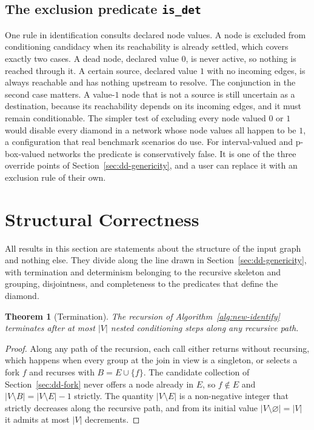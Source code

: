 \documentclass[12pt]{report}
\newtheorem{theorem}{Theorem}
\begin{document}
\subsection{The exclusion predicate \texttt{is\_det}}
\label{sec:dd-isdet}

One rule in identification consults declared node values. A node is excluded from conditioning candidacy when its reachability is already settled, which covers exactly two cases. A dead node, declared value $0$, is never active, so nothing is reached through it. A certain source, declared value $1$ with no incoming edges, is always reachable and has nothing upstream to resolve. The conjunction in the second case matters. A value-$1$ node that is not a source is still uncertain as a destination, because its reachability depends on its incoming edges, and it must remain conditionable. The simpler test of excluding every node valued $0$ or $1$ would disable every diamond in a network whose node values all happen to be $1$, a configuration that real benchmark scenarios do use. For interval-valued and p-box-valued networks the predicate is conservatively false. It is one of the three override points of Section~\ref{sec:dd-genericity}, and a user can replace it with an exclusion rule of their own.

\section{Structural Correctness}
\label{sec:dd-correctness}

All results in this section are statements about the structure of the input graph and nothing else. They divide along the line drawn in Section~\ref{sec:dd-genericity}, with termination and determinism belonging to the recursive skeleton and grouping, disjointness, and completeness to the predicates that define the diamond.

\begin{theorem}[Termination]
\label{thm:termination}
The recursion of Algorithm~\ref{alg:new-identify} terminates after at most $|V|$ nested conditioning steps along any recursive path.
\end{theorem}

\begin{proof}
Along any path of the recursion, each call either returns without recursing, which happens when every group at the join in view is a singleton, or selects a fork $f$ and recurses with $B = E \cup \{f\}$. The candidate collection of Section~\ref{sec:dd-fork} never offers a node already in $E$, so $f \notin E$ and $|V \setminus B| = |V \setminus E| - 1$ strictly. The quantity $|V \setminus E|$ is a non-negative integer that strictly decreases along the recursive path, and from its initial value $|V \setminus \varnothing| = |V|$ it admits at most $|V|$ decrements.
\end{proof}
\end{document}
